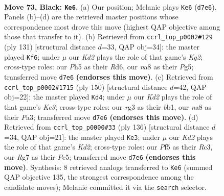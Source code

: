 \documentclass[11pt]{article}
\begin{document}
\clearpage

\begin{figure}[p]\centering
\begin{subfigure}{0.46\textwidth}\centering
\resizebox{\linewidth}{!}{%
\newchessgame
\chessboard[
  setfen={N7/p2k2r1/P1p3p1/2P2p1p/bP3P1P/6R1/5K2/8 b - - 2 73},
  showmover=false,
  pgfstyle=straightmove, color=movearrow, markmove={d7-e6}
]}
\caption{}
\end{subfigure}\hfill
\begin{subfigure}{0.46\textwidth}\centering
\resizebox{\linewidth}{!}{%
\newchessgame
\chessboard[
  setfen={8/1R3pk1/3r4/1p1p1Pp1/4p2p/4P2P/6P1/3B3K b - - 0 66},
  showmover=false,
  pgfstyle=straightmove, color=movearrow, markmove={g7-f6}
]}
\caption{}
\end{subfigure}
\\[4pt]
\begin{subfigure}{0.46\textwidth}\centering
\resizebox{\linewidth}{!}{%
\newchessgame
\chessboard[
  setfen={8/4k3/5pp1/B6p/p1p1PP2/P3K1PP/1P6/1b6 w - - 11 76},
  showmover=false,
  pgfstyle=straightmove, color=movearrow, markmove={e3-d4}
]}
\caption{}
\end{subfigure}\hfill
\begin{subfigure}{0.46\textwidth}\centering
\resizebox{\linewidth}{!}{%
\newchessgame
\chessboard[
  setfen={8/3k1p2/6p1/1p2P1p1/pP4P1/P1R2P2/3K4/1r6 w - - 7 69},
  showmover=false,
  pgfstyle=straightmove, color=movearrow, markmove={d2-e3}
]}
\caption{}
\end{subfigure}
\caption{\textbf{Move 73, Black: \texttt{Ke6}.} (a) Our position; Melanie plays \texttt{Ke6} (\texttt{d7e6}). Panels (b)--(d) are the retrieved master positions whose correspondence most drove this move (highest QAP objective among those that transfer to it). (b) Retrieved from \texttt{ccrl\_top\_p0002\#129} (ply 131) [structural distance $d$=33, QAP obj=34]: the master played \texttt{Kf6}; under $\mu$ our \emph{Kd2} plays the role of that game's \emph{Kg2}; cross-type roles: our \emph{P}h5 as their \emph{R}d6, our \emph{n}a8 as their \emph{P}g5; transferred move \texttt{d7e6} \textbf{(endorses this move)}. (c) Retrieved from \texttt{ccrl\_top\_p0002\#1715} (ply 150) [structural distance $d$=42, QAP obj=22]: the master played \texttt{Kd4}; under $\mu$ our \emph{Kd2} plays the role of that game's \emph{Ke3}; cross-type roles: our \emph{r}g3 as their \emph{b}b1, our \emph{n}a8 as their \emph{P}a3; transferred move \texttt{d7e6} \textbf{(endorses this move)}. (d) Retrieved from \texttt{ccrl\_top\_p0000\#33} (ply 136) [structural distance $d$=34, QAP obj=21]: the master played \texttt{Ke3}; under $\mu$ our \emph{Kd2} plays the role of that game's \emph{Kd2}; cross-type roles: our \emph{P}f5 as their \emph{R}c3, our \emph{R}g7 as their \emph{P}e5; transferred move \texttt{d7e6} \textbf{(endorses this move)}. Synthesis: 8 retrieved analogs transferred to \texttt{Ke6} (summed QAP objective 135, the strongest correspondence among the candidate moves); Melanie committed it via the \texttt{search} selector.}
\label{fig:thought-m145}
\end{figure}
\end{document}
